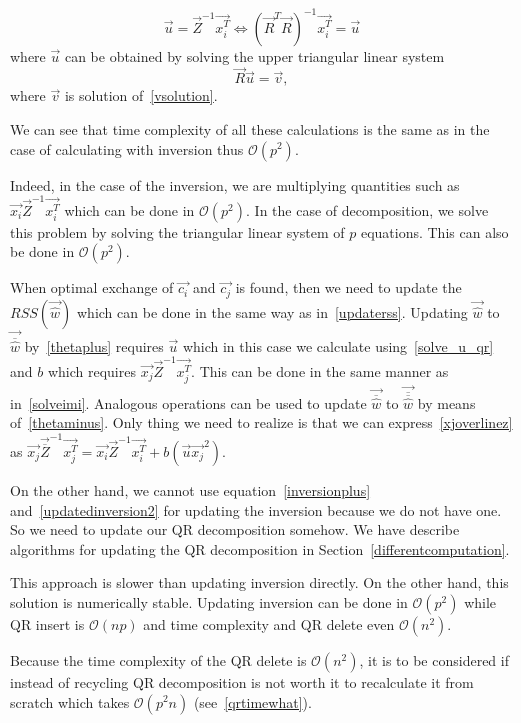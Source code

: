\begin{equation}
    \vec{u} = \vec{Z}^{-1}\vec{x_i^T}     \iff (\vec{R}^T\vec{R})^{-1}\vec{x_i^T} = \vec{u}
\end{equation}
where $\vec{u}$ can be obtained by solving the upper triangular linear system 
\begin{equation} \label{solve_u_qr}
    \vec{R}\vec{u} = \vec{v},
\end{equation}
where $\vec{v}$ is solution of~\eqref{vsolution}. 


We can see that time complexity of all these calculations is the same as in the case of calculating with inversion thus $\mathcal{O}(p^2)$.

Indeed, in the case of the inversion, we are multiplying quantities such as $\vec{x_i}\vec{Z}^{-1}\vec{x_i^T}$ which can be done in $\mathcal{O}(p^2)$.
In the case of decomposition, we solve this problem by solving the triangular linear system of $p$ equations. This can also be done in $\mathcal{O}(p^2)$.


When optimal exchange of $\vec{c_i}$ and $ \vec{c_j}$ is found, then we need to update the $RSS(\vec{\hat{w}})$ which can be done in the same way as in~\eqref{updaterss}. Updating $\vec{\hat{w}}$ to  $\vec{\overline{\hat{w}}}$ by~\eqref{thetaplus} requires
$\vec{u}$  which in this case we calculate using~\eqref{solve_u_qr} and $b$ which requires  $\vec{x_j}\vec{Z}^{-1}\vec{x_j^T}$. This can be done in the same manner as in~\eqref{solveimi}. Analogous operations can be used to update $\vec{\overline{\hat{w}}}$ to $\vec{\overline{\overline{\hat{w}}}}$  by means of~\eqref{thetaminus}. Only thing we need to realize is that we can express~\eqref{xjoverlinez} as $\vec{x_j}\vec{\overline{{Z}}}^{-1}\vec{x_j^T} = \vec{x_i}\vec{{{Z}}}^{-1}\vec{x_i^T} + b(\vec{u}\vec{x_j}^2)$.

On the other hand, we cannot use equation~\eqref{inversionplus} and~\eqref{updatedinversion2} for updating the inversion because we do not have one. So we need to update our QR decomposition somehow. We have describe algorithms for updating the QR decomposition in Section~\ref{differentcomputation}. 

This approach is slower than updating inversion directly. On the other hand, this solution is numerically stable. Updating inversion can be done in $\mathcal{O}(p^2)$  while QR insert is $\mathcal{O}(np)$ and time complexity and QR delete even $\mathcal{O}(n^2)$.


\begin{note}
Because the time complexity of the QR delete is $\mathcal{O}(n^2)$, it is to be considered if instead of recycling QR decomposition is not worth it to recalculate it from scratch which takes $\mathcal{O}(p^2n)$ (see~\eqref{qrtimewhat}).
\end{note}


